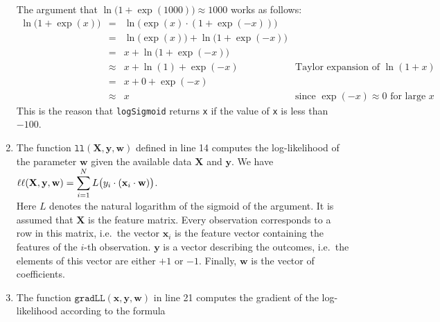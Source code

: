 \begin{enumerate}
      The argument that $\ln\bigl(1 + \exp(1000)\bigr) \approx 1000$ works as follows:
      \\[0.2cm]
      \hspace*{1.3cm}
      $
      \begin{array}{lcll}
        \ln\bigl(1+\exp(x)\bigr) & = & \ln\bigl(\exp(x) \cdot (1+\exp(-x))\bigr)          \\[0.2cm]
                                 & = & \ln\bigl(\exp(x)\bigr) + \ln\bigl(1+\exp(-x)\bigr) \\[0.2cm]
                                 & = & x + \ln\bigl(1+\exp(-x)\bigr) \\[0.2cm]
                                 & \approx & x + \ln(1) + \exp(-x) & \mbox{Taylor expansion of $\ln(1+x)$} \\[0.2cm]
                                 & = & x + 0 + \exp(-x)                                      \\[0.2cm]
                                 & \approx & x                & \mbox{since $\exp(-x) \approx 0$ for large $x$} 
      \end{array}
      $
      \\[0.2cm]
      This is the reason that \texttt{logSigmoid} returns \texttt{x} if the value of \texttt{x} is less than
      $-100$.
\item The function $\mathtt{ll}(\mathbf{X}, \mathbf{y}, \mathbf{w})$ defined in line 14 computes the
      log-likelihood of the parameter $\mathbf{w}$ given the available data $\mathbf{X}$ and $\mathbf{y}$.
      We have
      \\[0.2cm]
      \hspace*{1.3cm}
      $\displaystyle \ell\ell(\mathbf{X},\mathbf{y},\mathbf{w}) = 
           \sum\limits_{i=1}^N L\bigl(y_i \cdot(\mathbf{x}_i \cdot \mathbf{w})\bigr)
      $.
      \\[0.2cm]
      Here $L$ denotes the natural logarithm of the sigmoid of the argument.
      It is assumed that $\mathbf{X}$ is the feature matrix.  Every observation corresponds to a row in this
      matrix, i.e.~the vector $\mathbf{x}_i$ is the feature vector containing the features of the
      $i$-th observation.  $\mathbf{y}$ is a vector describing the outcomes, i.e.~the elements
      of this vector are either $+1$ or $-1$.  Finally, $\mathbf{w}$ is the vector of coefficients.
\item The function $\mathtt{gradLL}(\mathbf{x}, \mathbf{y}, \mathbf{w})$ in line 21 computes the gradient of
      the log-likelihood according to the formula

\end{enumerate}
